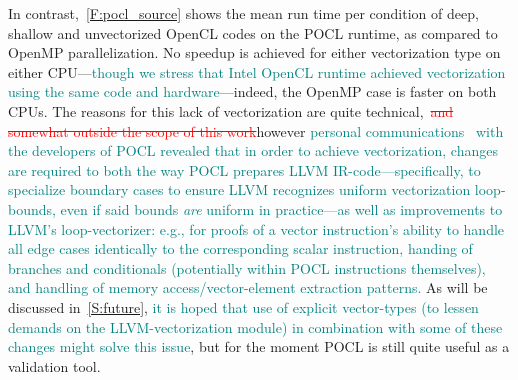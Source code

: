 \documentclass[12pt,number,sort&compress,preprint]{elsarticle}
\newcommand{\add}[1]{{\sloppy\textcolor{teal}{#1}}}  %
\newcommand{\delete}[1]{\sloppy\textcolor{red}{\sout{#1}}} %
\begin{document}
In contrast,~\cref{F:pocl_source} shows the mean run time per condition of deep, shallow and unvectorized OpenCL codes on the POCL runtime, as compared to OpenMP parallelization.
No speedup is achieved for either vectorization type on either CPU---\add{though we stress that Intel OpenCL runtime achieved vectorization using the same code and hardware}---indeed, the OpenMP case is faster on both CPUs.
The reasons for this lack of vectorization are quite technical,~\delete{and somewhat outside the scope of this work}however \add{personal communications~\cite{pocl_communication} with the developers of POCL revealed that in order to achieve vectorization, changes are required to both the way POCL prepares LLVM \cite{Lattner:2004:LCF:977395.977673} IR-code---specifically, to specialize boundary cases to ensure LLVM recognizes uniform vectorization loop-bounds, even if said bounds \textit{are} uniform in practice---as well as improvements to LLVM's loop-vectorizer: e.g., for proofs of a vector instruction's ability to handle all edge cases identically to the corresponding scalar instruction, handing of branches and conditionals (potentially within POCL instructions themselves), and handling of memory access\slash vector-element extraction patterns.}
As will be discussed in~\cref{S:future}, \add{it is hoped that use of explicit vector-types (to lessen demands on the LLVM-vectorization module) in combination with some of these changes might solve this issue}, but for the moment POCL is still quite useful as a validation tool.
\end{document}
